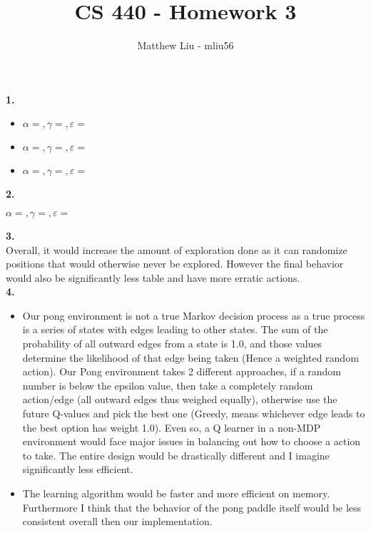 \documentclass[titlepage]{article}
\title{CS 440 - Homework 3}
\author{Matthew Liu - mliu56}
\date{}
\begin{document}
\maketitle{}

\noindent \textbf{1.}\\
\begin{itemize}
	\item $\alpha = , \gamma = , \varepsilon = $
	\item $\alpha = , \gamma = , \varepsilon = $
	\item $\alpha = , \gamma = , \varepsilon = $
\end{itemize}

\noindent \textbf{2.}\\
\centerline{$\alpha = , \gamma = , \varepsilon = $}

\noindent \textbf{3.}\\

Overall, it would increase the amount of exploration done as it can randomize positions that would otherwise never be explored. However the final behavior would also be significantly less table and have more erratic actions.\\

\noindent \textbf{4.}\\
\begin{itemize}
	\item Our pong environment is not a true Markov decision process as a true process is a series of states with edges leading to other states. The sum of the probability of all outward edges from a state is 1.0, and those values determine the likelihood of that edge being taken (Hence a weighted random action). Our Pong environment takes 2 different approaches, if a random number is below the epsilon value, then take a completely random action/edge (all outward edges thus weighed equally), otherwise use the future Q-values and pick the best one (Greedy, means whichever edge leads to the best option has weight 1.0). Even so, a Q learner in a non-MDP environment would face major issues in balancing out how to choose a action to take. The entire design would be drastically different and I imagine significantly less efficient.
	\item The learning algorithm would be faster and more efficient on memory. Furthermore I think that the behavior of the pong paddle itself would be less consistent overall then our implementation.
\end{itemize}
\end{document}
